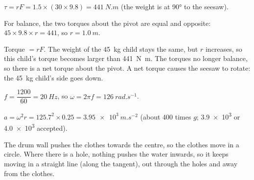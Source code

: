 \documentclass[12pt]{article}
\begin{document}
\ansq
{}
\begin{crit}
\end{crit}
\sample
$\tau = rF = 1.5 \times (30 \times 9.8) = \qty{441}{N.m}$ (the weight is at \ang{90} to the seesaw).
\begin{crit}
\end{crit}
\sample
For balance, the two torques about the pivot are equal and opposite:
$45 \times 9.8 \times r = 441$, so $r = \qty{1.0}{m}$.
\begin{crit}
\end{crit}
\sample
Torque $= rF$. The weight of the \qty{45}{kg} child stays the same, but $r$ increases, so this child's
torque becomes larger than \qty{441}{N.m}. The torques no longer balance, so there is a net torque
about the pivot. A net torque causes the seesaw to rotate: the \qty{45}{kg} child's side goes down.

\ansq
{}
\begin{crit}
\end{crit}
\sample
$f = \dfrac{1200}{60} = \qty{20}{Hz}$, so $\omega = 2\pi f = \qty{126}{rad.s^{-1}}$.
\begin{crit}
\end{crit}
\sample
$a = \omega^2 r = 125.7^2 \times 0.25 = \qty{3.95e3}{m.s^{-2}}$ (about 400 times $g$; \num{3.9e3} or
\num{4.0e3} accepted).
\begin{crit}
\end{crit}
\sample
The drum wall pushes the clothes towards the centre, so the clothes move in a circle. Where there is
a hole, nothing pushes the water inwards, so it keeps moving in a straight line (along the tangent),
out through the holes and away from the clothes.
\end{document}

